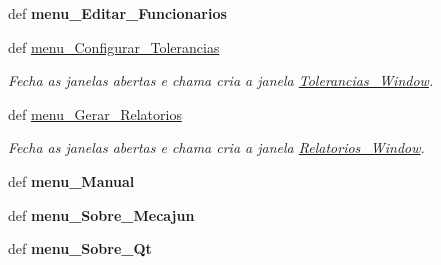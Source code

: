 \begin{DoxyCompactItemize}
\item 
\hypertarget{classview_1_1Controle__De__Acesso__Window_a84eef60e7eed218ca13aedfede1e45d2}{def {\bfseries menu\-\_\-\-Editar\-\_\-\-Funcionarios}}\label{classview_1_1Controle__De__Acesso__Window_a84eef60e7eed218ca13aedfede1e45d2}

\item 
\hypertarget{classview_1_1Controle__De__Acesso__Window_ad46bb47528f3df10521d824095edc96e}{def \hyperlink{classview_1_1Controle__De__Acesso__Window_ad46bb47528f3df10521d824095edc96e}{menu\-\_\-\-Configurar\-\_\-\-Tolerancias}}\label{classview_1_1Controle__De__Acesso__Window_ad46bb47528f3df10521d824095edc96e}

\begin{DoxyCompactList}\small\item\em \-Fecha as janelas abertas e chama cria a janela \hyperlink{classview_1_1Tolerancias__Window}{\-Tolerancias\-\_\-\-Window}. \end{DoxyCompactList}\item 
\hypertarget{classview_1_1Controle__De__Acesso__Window_a514251beb07fadc13d14ecd97118ffd0}{def \hyperlink{classview_1_1Controle__De__Acesso__Window_a514251beb07fadc13d14ecd97118ffd0}{menu\-\_\-\-Gerar\-\_\-\-Relatorios}}\label{classview_1_1Controle__De__Acesso__Window_a514251beb07fadc13d14ecd97118ffd0}

\begin{DoxyCompactList}\small\item\em \-Fecha as janelas abertas e chama cria a janela \hyperlink{classview_1_1Relatorios__Window}{\-Relatorios\-\_\-\-Window}. \end{DoxyCompactList}\item 
\hypertarget{classview_1_1Controle__De__Acesso__Window_adbce5d80e88e00f6c46b7f4088334aff}{def {\bfseries menu\-\_\-\-Manual}}\label{classview_1_1Controle__De__Acesso__Window_adbce5d80e88e00f6c46b7f4088334aff}

\item 
\hypertarget{classview_1_1Controle__De__Acesso__Window_ae47643048ddf27715463f4bd2fe90c4b}{def {\bfseries menu\-\_\-\-Sobre\-\_\-\-Mecajun}}\label{classview_1_1Controle__De__Acesso__Window_ae47643048ddf27715463f4bd2fe90c4b}

\item 
\hypertarget{classview_1_1Controle__De__Acesso__Window_a5d477fd558a43e9e4198fa0238d6fe4a}{def {\bfseries menu\-\_\-\-Sobre\-\_\-\-Qt}}\label{classview_1_1Controle__De__Acesso__Window_a5d477fd558a43e9e4198fa0238d6fe4a}


\end{DoxyCompactItemize}
